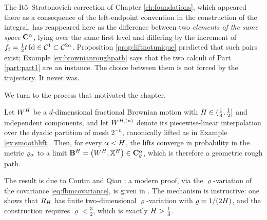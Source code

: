 The Itô--Stratonovich correction of Chapter
\ref{ch:foundations}, which appeared there as a consequence of the left-endpoint convention in the
construction of the integral, has reappeared here as the difference between two \emph{elements of
the same space} $\mathbf{C}^{\alpha}$, lying over the same first level and differing by the increment of
$f_t = \tfrac12 t\,\mathrm{Id} \in \mathcal{C}^{1} \subset \mathcal{C}^{2\alpha}$. Proposition
\ref{prop:liftnotunique} predicted that such pairs exist; Example \ref{ex:brownianroughpath} says
that the two calculi of Part \ref{part:part1} are an instance. The choice between them is not
forced by the trajectory. It never was.

We turn to the process that motivated the chapter.

\begin{theorem}\label{thm:fbmlift}
Let $W^{H}$ be a $d$-dimensional fractional Brownian motion with $H \in (\tfrac13,\tfrac12]$ and
independent components, and let $W^{H,(n)}$ denote its piecewise-linear interpolation over the
dyadic partition of mesh $2^{-n}$, canonically lifted as in Example \ref{ex:smoothlift}. Then, for
every $\alpha < H$, the lifts converge in probability in the metric $\varrho_{\alpha}$ to a limit
$\mathbf{B}^{H} = \bigl(W^{H},\mathbb{X}^{H}\bigr) \in \mathbf{C}_{g}^{\alpha}$, which is therefore a geometric
rough path. \qedopentext
\end{theorem}


The result is due to Coutin and Qian \cite{coutinqian2002}; a modern proof, via the
$\varrho$-variation of the covariance \eqref{eq:fbmcovariance}, is given in
\cite[Ch.\ 10]{frizhairer2020}. The mechanism is instructive: one shows that
$R_H$ has finite two-dimensional $\varrho$-variation with $\varrho = 1/(2H)$, and the
construction requires $\varrho < \tfrac32$, which is exactly $H > \tfrac13$.

